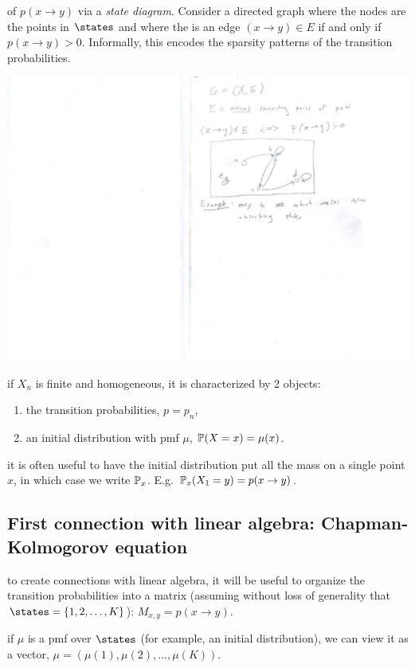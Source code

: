 \documentclass{article}
\begin{document}
 of $p(x \to y)$ via a \emph{state diagram}. Consider a directed graph where the nodes are the points in $\states$ and where the is an edge $(x \to y) \in E$ if and only if $p(x \to y) > 0$. Informally, this encodes the sparsity patterns of the transition probabilities.
\begin{center}
	\includegraphics[width=0.3\linewidth]{figures/state-diagram} 
\end{center}

 if $X_n$ is finite and homogeneous, it is characterized by 2 objects:
\begin{enumerate}
  \item the transition probabilities, $p = p_n$,
  \item an initial distribution with pmf $\mu$, $\P(X = x) = \mu(x)$. 
\end{enumerate} 

 it is often useful to have the initial distribution put all the mass on a single point $x$, in which case we write $\P_x$. E.g. $\P_x(X_1 = y) = p(x \to y)$. 


\subsection{First connection with linear algebra: Chapman-Kolmogorov equation}

 to create connections with linear algebra, it will be useful to organize the transition probabilities into a matrix (assuming without loss of generality that $\states = \{1, 2, \dots, K\}$): $M_{x,y} = p(x \to y)$.

 if $\mu$ is a pmf over $\states$ (for example, an initial distribution), we can view it as a vector, $\mu = (\mu(1), \mu(2), \dots, \mu(K))$. 
\end{document}
